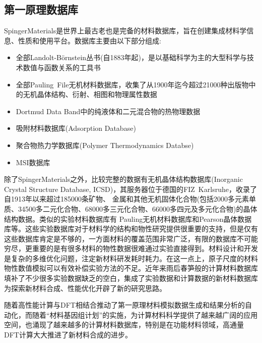 \subsection{第一原理数据库}
\textrm{SpingerMaterials}\cite{SpringerM_URL}是世界上最古老也是完备的材料数据库，旨在创建集成材料学信息、性质和使用平台。数据库主要由以下部分组成:
\begin{itemize}
	\item 全部\textrm{Landolt-B{\"o}rnstein}丛书(自1883年起)，是以基础科学为主的大型科学与技术数值与函数关系的工具书
	\item 全部\textrm{Pauling~File}无机材料数据库，收集了从1900年迄今超过21000种出版物中的无机晶体结构、衍射、相图和物理属性数据
	\item \textrm{Dortmud Data Band}中的纯液体和二元混合物的热物理数据
	\item 吸附材料数据库(\textrm{Adsorption Database})
	\item 聚合物热力学数据库(\textrm{Polymer Thermodynamics Databse})
	\item \textrm{MSI}数据库
\end{itemize}

除了\textrm{SpingerMaterials}之外，比较完整的数据有无机晶体结构数据库\textrm{(Inorganic Crystal Structure Database, ICSD)}\cite{ICSD_URL}，其服务器位于德国的\textrm{FIZ~Karlsruhe}，收录了自1913年以来超过185000条矿物、 金属和其他无机固体化合物(包括2000多元素单质、34500多二元化合物、68000多三元化合物、66000多四元及多元化合物)的晶体结构数据。类似的实验材料数据库有%
\textrm{Pauling}无机材料数据库\cite{Pauling_URL}和\textrm{Pearson}晶体数据库\cite{Pearson_URL}等。这些实验数据库对于材料学的结构和物性研究提供很重要的支持，但是仅有这些数据库肯定是不够的，一方面材料的覆盖范围非常广泛，有限的数据库不可能穷尽，更重要的是有很多材料的物性数据很难通过实验直接得到。材料设计和开发是复杂的多维优化问题，注定新材料研发耗时耗力。在这一点上，原子尺度的材料物性数值模拟可以有效补偿实验方法的不足。近年来雨后春笋般的计算材料数据库填补了不少很多实验数据缺乏的空白\cite{CMS58-227_2012}，集成了实验数据和计算数据的新材料数据库为探索新材料合成、性能优化开辟了新的研究思路。

随着高性能计算与\textrm{DFT}相结合推动了第一原理材料模拟数据生成和结果分析的自动化，而随着“材料基因组计划”的实施，为计算材料科学提供了越来越广阔的应用空间，也涌现了越来越多的计算材料数据库，特别是在功能材料领域，高通量\textrm{DFT}计算大大推进了新材料合成的进步。\cite{JCED59-3232_2014, IC53-11849_2014,JPCL4-3607_2013,PCCP16-22073_2014}

